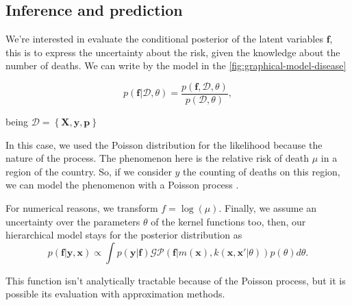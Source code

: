 \subsection{Inference and prediction}

We're interested in evaluate the conditional posterior of the latent variables $\mathbf{f}$, this is to express the uncertainty about the risk, given the knowledge about the number of deaths. We can write by the model in the \autoref{fig:graphical-model-disease}

\begin{equation}
    p(\mathbf{f}|\mathcal{D},\theta) = \frac{p(\mathbf{f},\mathcal{D},\theta)}{p(\mathcal{D},\theta)},
\end{equation}

being $\mathcal{D}=\left\{ \mathbf{X},\mathbf{y}, \mathbf{p} \right\}$

{\color{red}

In this case, we used the Poisson distribution for the likelihood because the nature of the process. The phenomenon here is the relative risk of death $\mu$ in a region of the country. So, if we consider $y$ the counting of deaths on this region, we can model the phenomenon with a Poisson process \cite{Vanhatalo2010Vehtari}.

For numerical reasons, we transform $f=\log(\mu)$. Finally, we assume an uncertainty over the parameters $\theta$ of the kernel functions too, then, our hierarchical model stays for the posterior distribution as 
%
\begin{equation}
    p(\mathbf{f}|\mathbf{y},\mathbf{x}) \propto \int p(\mathbf{y}|\mathbf{f})\mathcal{GP}\left(\mathbf{f} | m(\mathbf{x}),k(\mathbf{x},\mathbf{x}'|\theta) \right)p(\theta) d\theta.
\end{equation}

This function isn't analytically tractable because of the Poisson process, but it is possible its evaluation with approximation methods.

}
